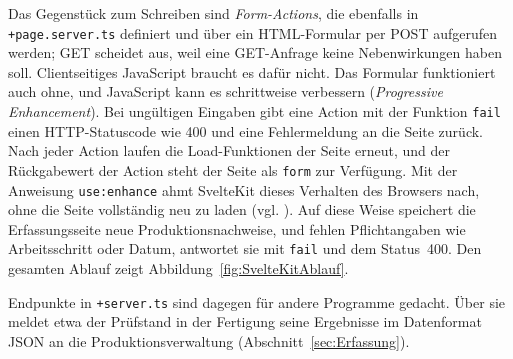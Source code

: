 Das Gegenstück zum Schreiben sind \emph{Form-Actions}, die ebenfalls in
\texttt{+page.server.ts} definiert und über ein HTML-Formular per POST
aufgerufen werden; GET scheidet aus, weil eine GET-Anfrage keine Nebenwirkungen haben
soll. Clientseitiges JavaScript braucht es dafür nicht. Das Formular
funktioniert auch ohne, und JavaScript kann es schrittweise verbessern
(\emph{Progressive Enhancement}). Bei ungültigen Eingaben gibt eine Action mit
der Funktion \texttt{fail} einen HTTP-Statuscode wie 400 und eine Fehlermeldung
an die Seite zurück. Nach jeder Action laufen die Load-Funktionen der Seite
erneut, und der Rückgabewert der Action steht der Seite als \texttt{form} zur
Verfügung. Mit der Anweisung \texttt{use:enhance} ahmt SvelteKit dieses
Verhalten des Browsers nach, ohne die Seite vollständig neu zu laden (vgl.
\cite[Abschnitt \enquote{Form actions}]{IntroductionSvelteKitDocsa}). Auf diese
Weise speichert die Erfassungsseite neue Produktionsnachweise, und fehlen
Pflichtangaben wie Arbeitsschritt oder Datum, antwortet sie mit \texttt{fail}
und dem Status~400. Den gesamten Ablauf zeigt Abbildung~\ref{fig:SvelteKitAblauf}.

Endpunkte in \texttt{+server.ts} sind dagegen für andere Programme gedacht.
Über sie meldet etwa der Prüfstand in der Fertigung seine Ergebnisse im
Datenformat JSON an die Produktionsverwaltung (Abschnitt~\ref{sec:Erfassung}).

